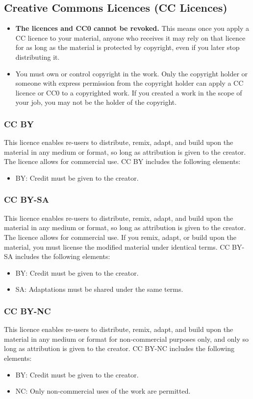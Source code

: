 \documentclass[11pt]{article}
\begin{document}
\subsection{Creative Commons Licences (CC Licences)}
\label{sec:orgdcbbc15}
\begin{itemize}
\item \textbf{The licences and CC0 cannot be revoked.} This means once you apply a CC licence to your material, anyone who receives it may rely on that licence for as long as the material is protected by copyright, even if you later stop distributing it.
\item You must own or control copyright in the work. Only the copyright holder or someone with express permission from the copyright holder can apply a CC licence or CC0 to a copyrighted work. If you created a work in the scope of your job, you may not be the holder of the copyright.
\end{itemize}

\subsubsection{CC BY}
\label{sec:orge4fbc4d}
This licence enables re-users to distribute, remix, adapt, and build upon the material in any medium or format, so long as attribution is given to the creator. The licence allows for commercial use. CC BY includes the following elements:
\begin{itemize}
\item BY: Credit must be given to the creator.
\end{itemize}

\subsubsection{CC BY-SA}
\label{sec:org5c170bc}
This licence enables re-users to distribute, remix, adapt, and build upon the material in any medium or format, so long as attribution is given to the creator. The licence allows for commercial use. If you remix, adapt, or build upon the material, you must license the modified material under identical terms. CC BY-SA includes the following elements:
\begin{itemize}
\item BY: Credit must be given to the creator.
\item SA: Adaptations must be shared under the same terms.
\end{itemize}

\subsubsection{CC BY-NC}
\label{sec:org218174c}
This licence enables re-users to distribute, remix, adapt, and build upon the material in any medium or format for non-commercial purposes only, and only so long as attribution is given to the creator. CC BY-NC includes the following elements:
\begin{itemize}
\item BY: Credit must be given to the creator.
\item NC: Only non-commercial uses of the work are permitted.
\end{itemize}
\end{document}
